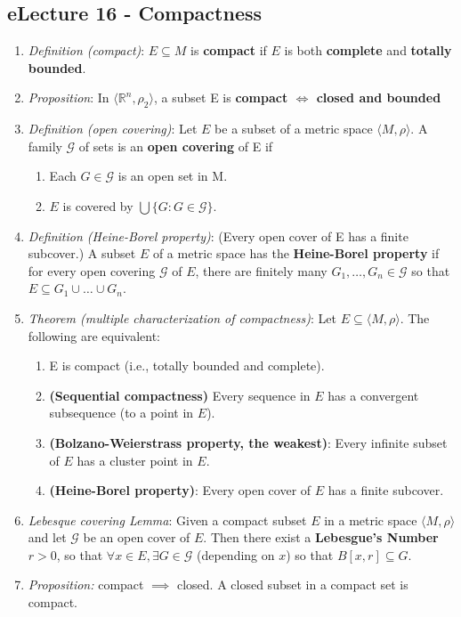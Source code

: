 \message{ !name(cheatsheet.tex)}\documentclass{article}
\begin{document}
\begin{multicols*}{3}
	\section{eLecture 16 - Compactness}
	\begin{enumerate}
		\item \emph{Definition (compact)}: \(E \subseteq M\) is \textbf{compact} if \(E\) is both
		      \textbf{complete} and \textbf{totally bounded}.
		\item \emph{Proposition}: In \(\langle\mathbb{R}^n, \rho_2\rangle\), a subset E is
		      \textbf{compact \(\iff\) closed and bounded}
		\item \emph{Definition (open covering)}: Let \(E\) be a subset of a metric space
		      \(\langle M,\rho\rangle\). A family \(\mathcal{G}\) of sets is an
		      \textbf{open
			      covering} of E if
		      \begin{enumerate}
			      \item Each \(G\in\mathcal{G}\) is an open set in M.
			      \item \(E\) is covered by \(\bigcup \{G:G\in\mathcal{G}\}\).
		      \end{enumerate}
		\item \emph{Definition (Heine-Borel property)}: (Every open cover of E has a finite
		      subcover.) A subset \(E\) of a metric space has the
		      \textbf{Heine-Borel property} if for every open covering \(\mathcal{G}\) of \(E\),
		      there are finitely many \(G_1,\dots,G_n\in\mathcal{G}\) so that \(E\subseteq
		      G_1\cup\dots\cup G_n\).
		\item \emph{Theorem (multiple characterization of compactness)}: Let \(E \subseteq
		      \langle M,\rho\rangle\). The following are equivalent:
		      \begin{enumerate}
			      \item E is compact (i.e., totally bounded and complete).
			      \item \textbf{(Sequential compactness)} Every sequence in \(E\) has a convergent
			            subsequence (to a point in \(E\)).
			      \item \textbf{(Bolzano-Weierstrass property, the weakest)}: Every infinite subset of
			            \(E\) has a cluster point in \(E\).
			      \item \textbf{(Heine-Borel property)}: Every open cover of \(E\) has a finite subcover.
		      \end{enumerate}
		\item \emph{Lebesque covering Lemma}: Given a compact subset \(E\) in a metric space
		      \(\langle M,\rho\rangle\) and let \(\mathcal{G}\) be an open cover of \(E\).
		      Then there exist a \textbf{Lebesgue's Number} \(r>0\), so that \(\forall x\in E,
		      \exists G\in\mathcal{G}\) (depending on \(x\)) so that \(B[x,r]\subseteq G\).
		\item \emph{Proposition:} compact \(\implies\) closed. A closed subset in a compact set
		      is compact.
	\end{enumerate}

\end{multicols*}
\end{document}
